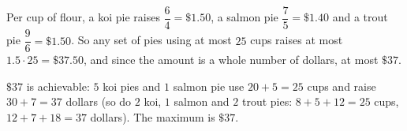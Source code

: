 Per cup of flour, a koi pie raises $\dfrac64=\$1.50$, a salmon pie $\dfrac75=\$1.40$ and a trout pie $\dfrac96=\$1.50$. So any set of pies using at most $25$ cups raises at most $1.5\cdot25=\$37.50$, and since the amount is a whole number of dollars, at most $\$37$.

$\$37$ is achievable: $5$ koi pies and $1$ salmon pie use $20+5=25$ cups and raise $30+7=37$ dollars (so do $2$ koi, $1$ salmon and $2$ trout pies: $8+5+12=25$ cups, $12+7+18=37$ dollars). The maximum is $\boxed{\$37}$.

